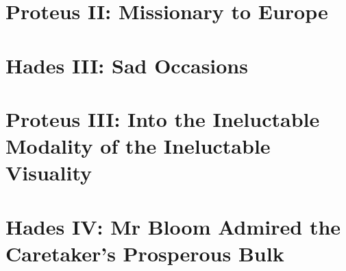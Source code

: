 \section*{Proteus II: Missionary to Europe}


\section*{Hades III: Sad Occasions}


\section*{Proteus III: Into the Ineluctable Modality of the Ineluctable Visuality}


\section*{Hades IV: Mr Bloom Admired the Caretaker's Prosperous Bulk}



